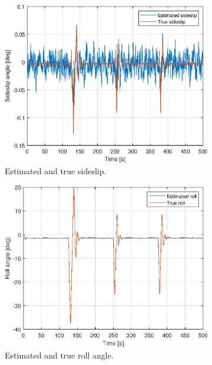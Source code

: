 \begin{figure}[ht]
\begin{subfigure}[b]{0.45\textwidth}
		\includegraphics[width=\textwidth]{figures/3e/beta_sideslip.eps}
		\caption{Estimated and true sideslip. }
		\label{fig:3e_beta_sideslip}
	\end{subfigure}
	\begin{subfigure}[b]{0.45\textwidth}
		\includegraphics[width=\textwidth]{figures/3e/roll_phi.eps}
		\caption{Estimated and true roll angle. }
		\label{fig:3e_roll_angle}
    \end{subfigure}	
    \begin{subfigure}[b]{0.45\textwidth}

\end{subfigure}
\end{figure}
